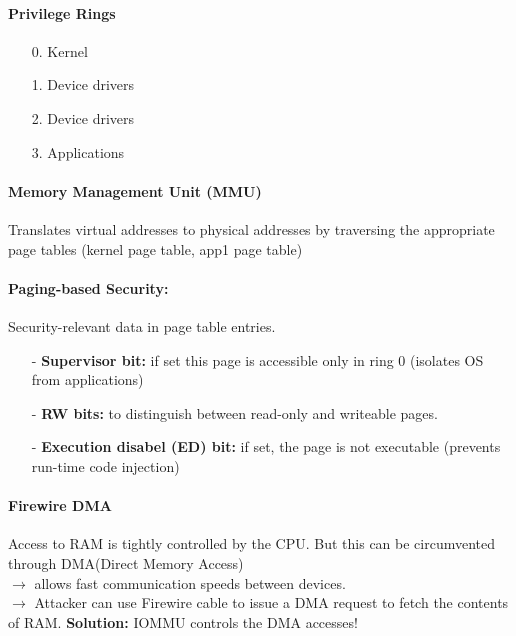 \paragraph{Privilege Rings}
\begin{itemize}
    \item[0.]Kernel
    \item[1.]Device drivers
    \item[2.]Device drivers
    \item[3.]Applications
\end{itemize}

\paragraph{Memory Management Unit (MMU)}
Translates virtual addresses to physical addresses by traversing the appropriate page tables (kernel page table, app1 page table)

\paragraph{Paging-based Security: }Security-relevant data in page table entries.
\begin{itemize}
    \item[-]\textbf{Supervisor bit: }if set this page is accessible only in ring 0 (isolates OS from applications)
    \item[-]\textbf{RW bits: }to distinguish between read-only and writeable pages.
    \item[-]\textbf{Execution disabel (ED) bit: }if set, the page is not executable (prevents run-time code injection)
\end{itemize}

\paragraph{Firewire DMA}
Access to RAM is tightly controlled by the CPU. But this can be circumvented through DMA(Direct Memory Access)\\
$\rightarrow$ allows fast communication speeds between devices.\\
$\rightarrow$ Attacker can use Firewire cable to issue a DMA request to fetch the contents of RAM.
\textbf{Solution: }IOMMU controls the DMA accesses!

